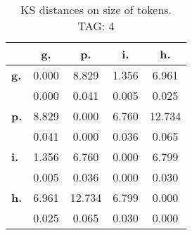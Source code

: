 \begin{table}[h!]
\begin{center}
\begin{tabular}{| l || c | c | c | c |}\hline
 & {\bf g.} & {\bf p.} & {\bf i.} & {\bf h.} \\\hline\hline
{\bf g.} & 0.000 & 8.829 & 1.356 & 6.961 \\
{\bf } & 0.000 & 0.041 & 0.005 & 0.025 \\\hline
{\bf p.} & 8.829 & 0.000 & 6.760 & 12.734 \\
{\bf } & 0.041 & 0.000 & 0.036 & 0.065 \\\hline
{\bf i.} & 1.356 & 6.760 & 0.000 & 6.799 \\
{\bf } & 0.005 & 0.036 & 0.000 & 0.030 \\\hline
{\bf h.} & 6.961 & 12.734 & 6.799 & 0.000 \\
{\bf } & 0.025 & 0.065 & 0.030 & 0.000 \\\hline
\end{tabular}
\caption{KS distances on size of tokens. TAG: 4}
\end{center}
\end{table}